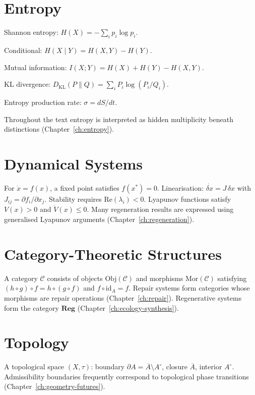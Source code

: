 \documentclass[12pt,twoside,openright]{book}
\begin{document}
\section{Entropy}

Shannon entropy: $H(X) = -\sum_i p_i \log p_i$.

Conditional: $H(X \mid Y) = H(X,Y) - H(Y)$.

Mutual information: $I(X;Y) = H(X)+H(Y)-H(X,Y)$.

KL divergence: $D_\mathrm{KL}(P \| Q)
= \sum_i P_i \log(P_i/Q_i)$.

Entropy production rate: $\sigma = dS/dt$.

Throughout the text entropy is interpreted as hidden
multiplicity beneath distinctions
(Chapter~\ref{ch:entropy}).

\section{Dynamical Systems}

For $\dot{x} = f(x)$, a fixed point satisfies
$f(x^*) = 0$. Linearisation: $\dot{\delta x} = J\,\delta x$
with $J_{ij} = \partial f_i/\partial x_j$.
Stability requires $\mathrm{Re}(\lambda_i) < 0$.
Lyapunov functions satisfy $V(x) > 0$ and
$\dot{V}(x) \le 0$.
Many regeneration results are expressed using
generalised Lyapunov arguments
(Chapter~\ref{ch:regeneration}).

\section{Category-Theoretic Structures}

A category $\mathcal{C}$ consists of objects
$\mathrm{Obj}(\mathcal{C})$ and morphisms
$\mathrm{Mor}(\mathcal{C})$ satisfying
$(h \circ g) \circ f = h \circ (g \circ f)$ and
$f \circ \mathrm{id}_A = f$.
Repair systems form categories whose morphisms are repair
operations (Chapter~\ref{ch:repair}).
Regenerative systems form the category $\mathbf{Reg}$
(Chapter~\ref{ch:ecology-synthesis}).

\section{Topology}

A topological space $(X, \tau)$:
boundary $\partial A = \overline{A} \setminus A^\circ$,
closure $\overline{A}$, interior $A^\circ$.
Admissibility boundaries frequently correspond to
topological phase transitions
(Chapter~\ref{ch:geometry-futures}).
\end{document}
